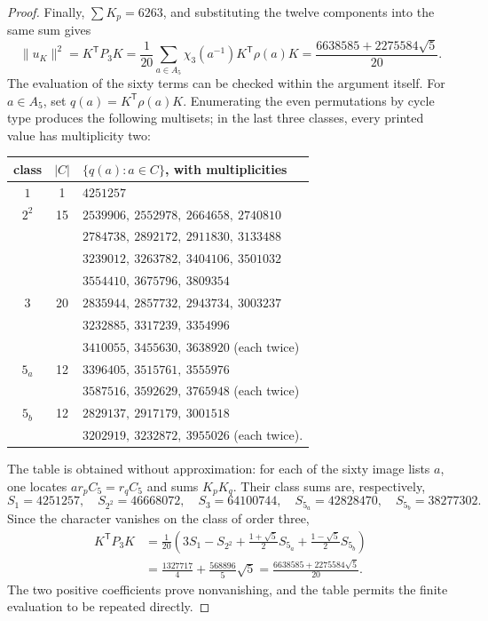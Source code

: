 \begin{proof}
Finally, \(\sum K_p=6263\), and substituting the twelve components into the
same sum gives
\[
 \lVert u_K\rVert^2=K^{\mathsf T}P_3K
 =\frac1{20}\sum_{a\in A_5}
                \chi_3(a^{-1})K^{\mathsf T}\rho(a)K
 =\frac{6638585+2275584\sqrt5}{20}.
\]
The evaluation of the sixty terms can be checked within the argument itself.
For \(a\in A_5\), set \(q(a)=K^{\mathsf T}\rho(a)K\). Enumerating the even
permutations by cycle type produces the following multisets; in the last
three classes, every printed value has multiplicity two:
\begin{center}
\footnotesize
\setlength{\tabcolsep}{5pt}
\begin{tabular}{@{}c|c|l@{}}
\textbf{class}&\(\lvert C\rvert\)&
\(\{q(a):a\in C\}\), with multiplicities\\ \hline
\(1\)&1&\(4251257\)\\
\(2^2\)&15&
\(2539906,\ 2552978,\ 2664658,\ 2740810\)\\
&&\(2784738,\ 2892172,\ 2911830,\ 3133488\)\\
&&\(3239012,\ 3263782,\ 3404106,\ 3501032\)\\
&&\(3554410,\ 3675796,\ 3809354\)\\
\(3\)&20&
\(2835944,\ 2857732,\ 2943734,\ 3003237\)\\
&&\(3232885,\ 3317239,\ 3354996\)\\
&&\(3410055,\ 3455630,\ 3638920\)\quad
   (each twice)\\
\(5_a\)&12&
\(3396405,\ 3515761,\ 3555976\)\\
&&\(3587516,\ 3592629,\ 3765948\)\quad
   (each twice)\\
\(5_b\)&12&
\(2829137,\ 2917179,\ 3001518\)\\
&&\(3202919,\ 3232872,\ 3955026\)\quad
   (each twice).
\end{tabular}
\end{center}
The table is obtained without approximation: for each of the sixty image
lists \(a\), one locates \(ar_pC_5=r_qC_5\) and sums \(K_pK_q\). Their
class sums are, respectively,
\[
 S_1=4251257,\quad S_{2^2}=46668072,\quad S_3=64100744,\quad
 S_{5_a}=42828470,\quad S_{5_b}=38277302.
\]
Since the character vanishes on the class of order three,
\begin{align*}
 K^{\mathsf T}P_3K
 &=\frac1{20}\left(3S_1-S_{2^2}
       +\frac{1+\sqrt5}{2}S_{5_a}
       +\frac{1-\sqrt5}{2}S_{5_b}\right)\\
 &=\frac{1327717}{4}+\frac{568896}{5}\sqrt5
  =\frac{6638585+2275584\sqrt5}{20}.
\end{align*}
The two positive coefficients prove nonvanishing, and the table permits the
finite evaluation to be repeated directly.
\end{proof}

